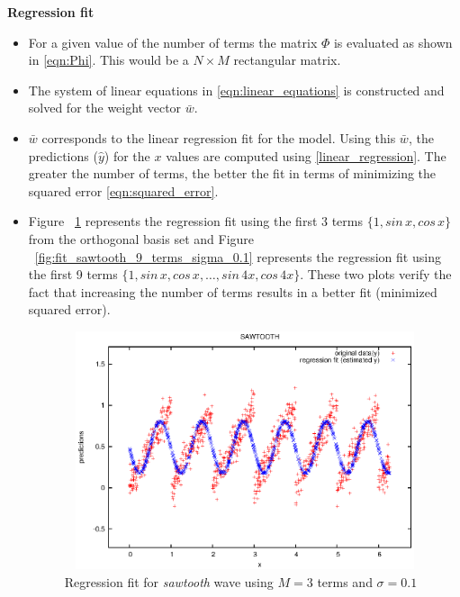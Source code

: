 \documentclass[a4paper,12pt]{article}
\begin{document}
\noindent \textbf{Regression fit}
\begin{itemize}
\item For a given value of the number of terms the matrix $\Phi$ is evaluated as shown in \eqref{eqn:Phi}. This would be a $N \times M$ rectangular matrix.
\item The system of linear equations in \eqref{eqn:linear_equations} is constructed and solved for the weight vector $\bar{w}$. 
\item $\bar{w}$ corresponds to the linear regression fit for the model. Using this $\bar{w}$, the predictions ($\hat{y}$) for the $x$ values are computed using \eqref{linear_regression}. The greater the number of terms, the better the fit in terms of minimizing the squared error \eqref{eqn:squared_error}.
\item Figure ~\ref{fig:fit_sawtooth_3_terms_sigma_0.1} represents the regression fit using the first 3 terms $\{1,sin\,x,cos\,x\}$ from the orthogonal basis set and Figure ~\ref{fig:fit_sawtooth_9_terms_sigma_0.1} represents the regression fit using the first 9 terms $\{1,sin\,x,cos\,x,\ldots,sin\,4x,cos\,4x\}$. These two plots verify the fact that increasing the number of terms results in a better fit (minimized squared error).
\begin{figure}[htpb]
  \begin{center}
    \includegraphics*[width=12cm,height=7cm]{./images/fit_sawtooth_3_terms_sigma_0.1.eps}
    \caption {Regression fit for \textit{sawtooth} wave using $M = 3$ terms and $\sigma = 0.1$}
    \label{fig:fit_sawtooth_3_terms_sigma_0.1}
  \end{center}
\end{figure}


\end{itemize}
\end{document}
